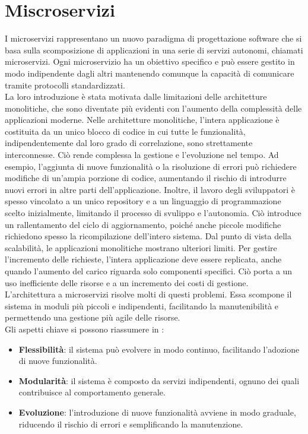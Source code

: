 \section{Miscroservizi}
I microservizi rappresentano un nuovo paradigma di progettazione software che si basa sulla scomposizione di applicazioni in una serie di servizi autonomi, chiamati microservizi.
Ogni microservizio ha un obiettivo specifico e può essere gestito in modo indipendente dagli altri mantenendo comunque la capacità di comunicare tramite protocolli standardizzati.
\\La loro introduzione è stata motivata dalle limitazioni delle architetture monolitiche, che sono diventate più evidenti con l'aumento della complessità delle applicazioni moderne. 
Nelle architetture monolitiche, l'intera applicazione è costituita da un unico blocco di codice in cui tutte le funzionalità, indipendentemente dal loro grado di correlazione, sono strettamente interconnesse.
Ciò rende complessa la gestione e l'evoluzione nel tempo. 
Ad esempio, l'aggiunta di nuove funzionalità o la risoluzione di errori può richiedere modifiche di
un'ampia porzione di codice, aumentando il rischio di introdurre nuovi errori in altre parti dell'applicazione.
Inoltre, il lavoro degli sviluppatori è spesso vincolato a un unico repository  
e a un linguaggio di programmazione scelto inizialmente, limitando il processo di svulippo e l'autonomia.
Ciò introduce un rallentamento del ciclo di aggiornamento, poiché anche piccole modifiche richiedono spesso la ricompilazione dell'intero sistema.
Dal punto di vista della scalabilità, le applicazioni monolitiche mostrano ulteriori limiti.
Per gestire l'incremento delle richieste, l'intera applicazione deve essere replicata, anche quando l'aumento del carico riguarda solo componenti specifici.
Ciò porta a un uso inefficiente delle risorse e a un incremento dei costi di gestione.
\\L'architettura a microservizi risolve molti di questi problemi.
Essa scompone il sistema in moduli più piccoli e indipendenti, facilitando la manutenibilità e permettendo una gestione più agile delle risorse.
\\Gli aspetti chiave si possono riassumere in \cite{dragoni2017}:
\begin{itemize}
    \item \textbf{Flessibilità}: il sistema può evolvere in modo continuo, facilitando l'adozione di nuove funzionalità.
    \item \textbf{Modularità}: il sistema è composto da servizi indipendenti, ognuno dei quali contribuisce al comportamento generale.
    \item \textbf{Evoluzione}: l'introduzione di nuove funzionalità avviene in modo graduale, riducendo il rischio di errori e semplificando la manutenzione.
\end{itemize}
